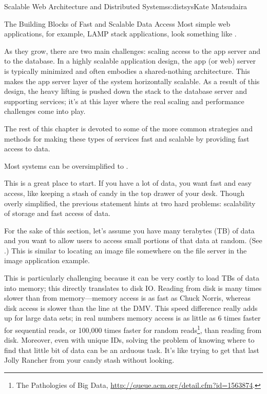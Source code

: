 \begin{aosachapter}{Scalable Web Architecture and Distributed Systems}{s:distsys}{Kate Matsudaira}
\begin{aosasect1}{The Building Blocks of Fast and Scalable Data Access}
Most simple web applications, for example, LAMP stack applications,
look something like .


As they grow, there are two main challenges: scaling access to the
app server and to the database. In a highly scalable application
design, the app (or web) server is typically minimized and often
embodies a shared-nothing architecture. This makes the app server
layer of the system horizontally scalable. As a result of this design,
the heavy lifting is pushed down the stack to the database server and
supporting services; it's at this layer where the real scaling and
performance challenges come into play.

The rest of this chapter is devoted to some of the more common
strategies and methods for making these types of services fast and
scalable by providing fast access to data.

Most systems can be oversimplified to .


This is a great place to start. If you have a lot of data, you want
fast and easy access, like keeping a stash of candy in the top drawer
of your desk. Though overly simplified, the previous statement hints
at two hard problems: scalability of storage and fast access of data.

For the sake of this section, let's assume you have many terabytes (TB)
of data and you want to allow users to access small portions 
of that data at random. (See .) 
This is similar to locating an image file
somewhere on the file server in the image application example.


This is particularly challenging because it can be very costly to load
TBs of data into memory; this directly translates to disk IO. Reading
from disk is many times slower than from memory---memory access is
as fast as Chuck Norris, whereas disk access is slower than the
line at the DMV. This speed difference really adds up for large
data sets; in real numbers memory access is as little as 6 times
faster for sequential reads, or 100,000 times faster for random
reads\footnote{The Pathologies of Big Data,
  \url{http://queue.acm.org/detail.cfm?id=1563874}.}, than reading from
disk. Moreover, even with unique IDs, solving the problem of
knowing where to find that little bit of data can be an arduous
task. It's like 
trying to get that last Jolly Rancher from your candy stash without
looking.


\end{aosasect1}
\end{aosachapter}

